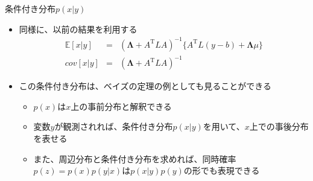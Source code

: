 \begin{frame}{条件付き分布$p(x|y)$}
 \begin{itemize}
  \item 同様に、以前の結果を利用する
        \begin{eqnarray}
         \mathbb{E}[x|y]& =& (\bm{\Lambda}+A^{\mathrm{T}}LA)^{-1}\{A^{\mathrm{T}}L(y-b)+\bm{\Lambda}\mu\}\\
         cov[x|y] &= & (\bm{\Lambda}+A^{\mathrm{T}}LA)^{-1}
        \end{eqnarray}
  \item この条件付き分布は、ベイズの定理の例としても見ることができる
        \begin{itemize}
         \item $p(x)$は$x$上の事前分布と解釈できる
         \item 変数$y$が観測されれば、条件付き分布$p(x|y)$を用いて、$x$上での事後分布を表せる
         \item また、周辺分布と条件付き分布を求めれば、同時確率$p(z)=p(x)p(y|x)$は$p(x|y)p(y)$の形でも表現できる
        \end{itemize}
 \end{itemize}

\end{frame}
